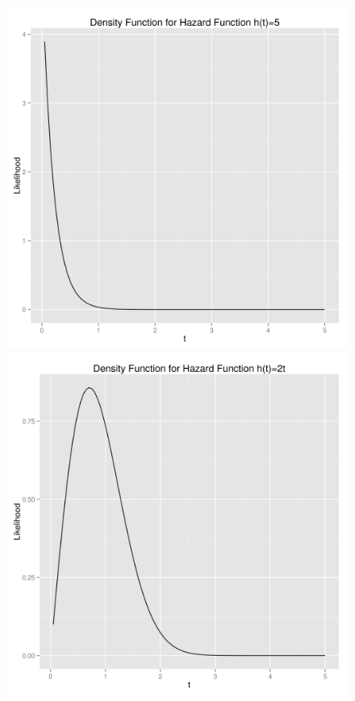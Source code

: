 \documentclass[letter]{article}
\begin{document}
\begin{figure}[H]
\centering
\includegraphics[scale=.33]{3_constant.png}
\includegraphics[scale=.33]{3_increasing.png}
\end{figure}
\end{document}
